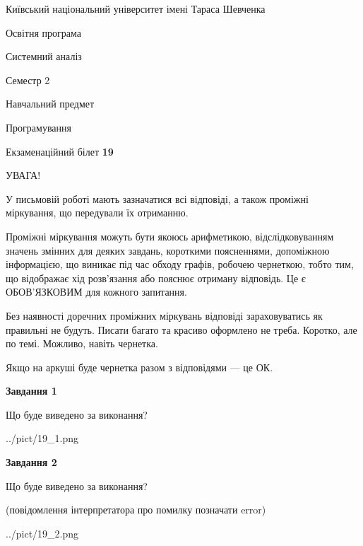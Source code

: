 \documentclass[12pt, ukrainian]{article}
\begin{document}
{{\begin {small}\par
{ \center  Київський національний університет імені Тараса Шевченка \par}
{\parbox {5 cm}{Освітня програма \hfill}{\parbox {7 cm}{Системний аналіз \hfill}}\parbox {6 cm}{\hfill Семестр 2}}\par
{\parbox {5 cm} {Навчальний предмет \hfill}\parbox {7 cm}{Програмування \hfill}\parbox {6cm}{\hfill}\par}\vspace{-7pt} \end{small}}{\center Екзаменаційний білет \No \textbf
{ 19 }\par}}
{
\begin {large}
УВАГА!

У письмовій роботі мають зазначатися всі відповіді, а також проміжні міркування, що передували їх отриманню.

Проміжні міркування можуть бути якоюсь арифметикою, відслідковуванням зна\-чень змінних для деяких завдань,
короткими поясненнями, допоміжною інформацією, що виникає під час обходу графів, робочею чернеткою,
тобто тим, що відображає хід розв’язання або пояснює отриману відповідь.
Це є ОБОВ’ЯЗКОВИМ для кожного запитання.

Без наявності доречних проміжних міркувань відповіді зараховуватись як правиль\-ні не будуть.
Писати багато та красиво оформлено не треба. Коротко, але по темі. Можли\-во, навіть чернетка.

Якщо на аркуші буде чернетка разом з відповідями --- це ОК.

\newpage

{\begin {center}\textbf{Завдання 1}\end {center}}\par
Що буде виведено за виконання?\par
\begin{center}
	{../pict/19_1.png}
\end{center}
\newpage

{\begin {center}\textbf{Завдання 2}\end {center}}\par
Що буде виведено за виконання?\par
 (повідомлення інтерпретатора про помилку позначати error)\par
\begin{center}
	{../pict/19_2.png}
\end{center}
\newpage


\end{large}}
\end{document}
